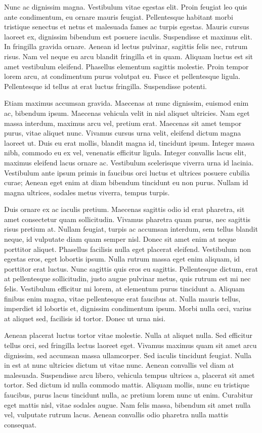 \documentclass[
  letterpaper,
  DIV=11,
  numbers=noendperiod]{scrreprt}
\begin{document}
Nunc ac dignissim magna. Vestibulum vitae egestas elit. Proin feugiat
leo quis ante condimentum, eu ornare mauris feugiat. Pellentesque
habitant morbi tristique senectus et netus et malesuada fames ac turpis
egestas. Mauris cursus laoreet ex, dignissim bibendum est posuere
iaculis. Suspendisse et maximus elit. In fringilla gravida ornare.
Aenean id lectus pulvinar, sagittis felis nec, rutrum risus. Nam vel
neque eu arcu blandit fringilla et in quam. Aliquam luctus est sit amet
vestibulum eleifend. Phasellus elementum sagittis molestie. Proin tempor
lorem arcu, at condimentum purus volutpat eu. Fusce et pellentesque
ligula. Pellentesque id tellus at erat luctus fringilla. Suspendisse
potenti.

Etiam maximus accumsan gravida. Maecenas at nunc dignissim, euismod enim
ac, bibendum ipsum. Maecenas vehicula velit in nisl aliquet ultricies.
Nam eget massa interdum, maximus arcu vel, pretium erat. Maecenas sit
amet tempor purus, vitae aliquet nunc. Vivamus cursus urna velit,
eleifend dictum magna laoreet ut. Duis eu erat mollis, blandit magna id,
tincidunt ipsum. Integer massa nibh, commodo eu ex vel, venenatis
efficitur ligula. Integer convallis lacus elit, maximus eleifend lacus
ornare ac. Vestibulum scelerisque viverra urna id lacinia. Vestibulum
ante ipsum primis in faucibus orci luctus et ultrices posuere cubilia
curae; Aenean eget enim at diam bibendum tincidunt eu non purus. Nullam
id magna ultrices, sodales metus viverra, tempus turpis.

Duis ornare ex ac iaculis pretium. Maecenas sagittis odio id erat
pharetra, sit amet consectetur quam sollicitudin. Vivamus pharetra quam
purus, nec sagittis risus pretium at. Nullam feugiat, turpis ac accumsan
interdum, sem tellus blandit neque, id vulputate diam quam semper nisl.
Donec sit amet enim at neque porttitor aliquet. Phasellus facilisis
nulla eget placerat eleifend. Vestibulum non egestas eros, eget lobortis
ipsum. Nulla rutrum massa eget enim aliquam, id porttitor erat luctus.
Nunc sagittis quis eros eu sagittis. Pellentesque dictum, erat at
pellentesque sollicitudin, justo augue pulvinar metus, quis rutrum est
mi nec felis. Vestibulum efficitur mi lorem, at elementum purus
tincidunt a. Aliquam finibus enim magna, vitae pellentesque erat
faucibus at. Nulla mauris tellus, imperdiet id lobortis et, dignissim
condimentum ipsum. Morbi nulla orci, varius at aliquet sed, facilisis id
tortor. Donec ut urna nisi.

Aenean placerat luctus tortor vitae molestie. Nulla at aliquet nulla.
Sed efficitur tellus orci, sed fringilla lectus laoreet eget. Vivamus
maximus quam sit amet arcu dignissim, sed accumsan massa ullamcorper.
Sed iaculis tincidunt feugiat. Nulla in est at nunc ultricies dictum ut
vitae nunc. Aenean convallis vel diam at malesuada. Suspendisse arcu
libero, vehicula tempus ultrices a, placerat sit amet tortor. Sed dictum
id nulla commodo mattis. Aliquam mollis, nunc eu tristique faucibus,
purus lacus tincidunt nulla, ac pretium lorem nunc ut enim. Curabitur
eget mattis nisl, vitae sodales augue. Nam felis massa, bibendum sit
amet nulla vel, vulputate rutrum lacus. Aenean convallis odio pharetra
nulla mattis consequat.
\end{document}

